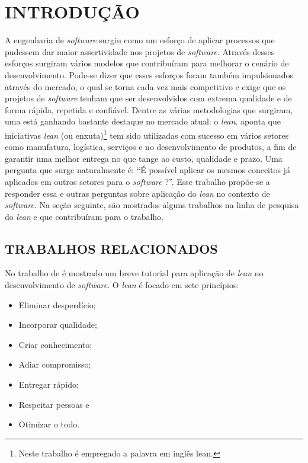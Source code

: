 \setcounter{page}{1}
\chapter{INTRODU\c{C}\~AO}  %
\label{chap:01}
A engenharia de \textit{software} surgiu como um esforço de aplicar processos que pudessem dar maior assertividade nos projetos de \textit{software}. Através desses esforços surgiram vários modelos que contribuíram para melhorar o cenário de desenvolvimento. Pode-se dizer que esses esforços foram também impulsionados através do mercado, o qual se torna cada vez mais competitivo e exige que os projetos de \textit{software} tenham que ser desenvolvidos com extrema qualidade e de forma rápida, repetida e confiável.
Dentre as várias metodologias que surgiram, uma está ganhando bastante destaque no mercado atual: o \textit{lean}.  aponta que iniciativas \textit{lean} (ou enxuta)\footnote{Neste trabalho é empregado a palavra em inglês lean.}  tem sido utilizadas com sucesso em vários setores como manufatura, logística, serviços e no desenvolvimento de produtos, a fim de garantir uma melhor entrega no que tange ao custo, qualidade e prazo. Uma pergunta que surge naturalmente é: “É possível aplicar os mesmos conceitos já aplicados em outros setores para o \textit{software} ?”. Esse trabalho propõe-se a responder essa e outras perguntas sobre aplicação do \textit{lean} no contexto de \textit{software}.
Na seção seguinte, são mostrados alguns trabalhos na linha de pesquisa do \textit{lean} e que contribuíram para o trabalho.

\section{TRABALHOS RELACIONADOS}

No trabalho  de  é mostrado um breve tutorial para aplicação de \textit{lean} no desenvolvimento de \textit{software}. O \textit{lean} é focado em sete princípios:

\begin{itemize}
	\item Eliminar desperdício;
	\item Incorporar qualidade;
	\item	Criar conhecimento;
	\item	Adiar compromisso;
	\item	Entregar rápido;
	\item	Respeitar pessoas e
	\item	Otimizar o todo.
\end{itemize}

